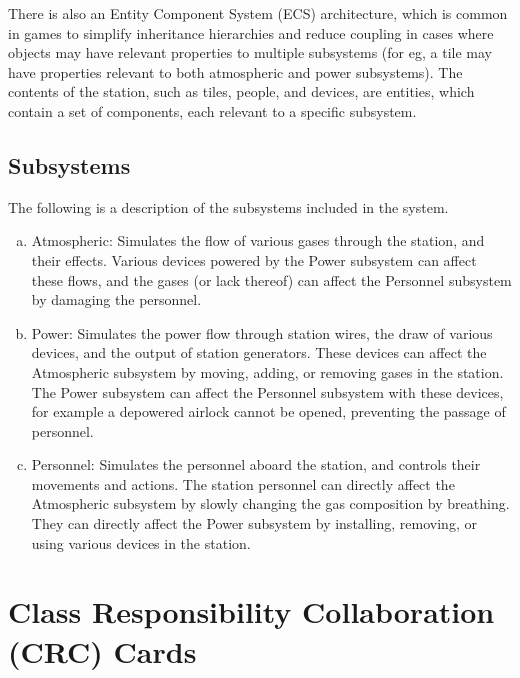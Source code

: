 \documentclass[]{article}
\begin{document}
There is also an Entity Component System (ECS) architecture, which is common in games to simplify inheritance hierarchies and reduce coupling in cases where objects may have relevant properties to multiple subsystems (for eg, a tile may have properties relevant to both atmospheric and power subsystems). The contents of the station, such as tiles, people, and devices, are entities, which contain a set of components, each relevant to a specific subsystem.

\subsection{Subsystems}
\label{sub:subsystems}
The following is a description of the subsystems included in the system.
\begin{enumerate}[a)]
	\item Atmospheric: Simulates the flow of various gases through the station, and their effects. Various devices powered by the Power subsystem can affect these flows, and the gases (or lack thereof) can affect the Personnel subsystem by damaging the personnel.
	\item Power: Simulates the power flow through station wires, the draw of various devices, and the output of station generators. These devices can affect the Atmospheric subsystem by moving, adding, or removing gases in the station. The Power subsystem can affect the Personnel subsystem with these devices, for example a depowered airlock cannot be opened, preventing the passage of personnel.
	\item Personnel: Simulates the personnel aboard the station, and controls their movements and actions. The station personnel can directly affect the Atmospheric subsystem by slowly changing the gas composition by breathing. They can directly affect the Power subsystem by installing, removing, or using various devices in the station.
\end{enumerate}

\section{Class Responsibility Collaboration (CRC) Cards}
\label{sec:class_responsibility_collaboration_crc_cards}
\end{document}
